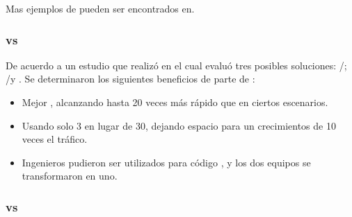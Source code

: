 
Mas ejemplos de \benchmarkQA pueden ser encontrados en\cite{online_nodejs_java_dzone}.


\subsubsection{\nodejsNAME vs \railsNAME \cite{online_nodejs_ruby_linkid}}

De acuerdo a un estudio que realizó \linkedInNAME en el cual evaluó tres posibles soluciones: \railsNAME/\eventMachineCPT; \pythonNAME/\twistedCPT y \nodejsNAME. Se determinaron los siguientes beneficios de parte de \nodejsNAME:

\begin{itemize}
	\item
		Mejor \performanceQA, \nodejsNAME alcanzando hasta 20 veces más rápido que \railsNAME en ciertos escenarios.
	\item
		Usando solo 3 \serverAS en lugar de 30, dejando espacio para un crecimientos de 10 veces el tráfico.
	\item
		Ingenieros \javaScriptNAME \frontEndAS pudieron ser utilizados para código \backendAS, y los dos equipos se transformaron en uno.

\end{itemize}


\subsubsection{\nodejsNAME vs \phpNAME \cite{online_nodejs_php_loadimpact}}

